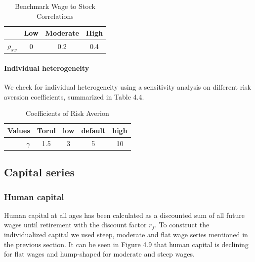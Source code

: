 \documentclass[]{elsarticle}
\begin{document}
\begin{table}
	\centering
	\caption{Benchmark Wage to Stock Correlations}
	\begin{tabular}[c]{c|ccc}
		&Low&Moderate&High\\
		\hline
		$\rho_{sw}$&0&0.2&0.4
	\end{tabular}
\end{table}


\paragraph{Individual heterogeneity}




We check for individual heterogeneity using a sensitivity analysis on different risk aversion coefficients, summarized in Table 4.4.

\begin{table}
	\centering
	\caption{Coefficients of Risk Averion}
	\begin{tabular}[c]{r|cccc}
		Values&Torul&low&default&high\\
		\hline
		$\gamma$&1.5&3&5&10\\
	\end{tabular}
\end{table}

\subsection{Capital series}

\subsubsection{Human capital}
Human capital at all ages has been calculated as a discounted sum of all future wages until retirement with the discount factor $r_f$. To construct the individualized capital we used steep, moderate and flat wage series mentioned in the previous section. It can be seen in Figure 4.9 that human capital is declining for flat wages and hump-shaped for moderate and steep wages. 
\end{document}

